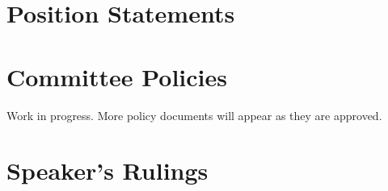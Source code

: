 \documentclass[12pt,letterpaper,oneside]{book}
\renewcommand{\thefootnote}{\fnsymbol{footnote}}%
\begin{document}
\chapter{Position Statements}


\chapter{Committee Policies}
Work in progress. More policy documents will appear as they are approved.

















\renewcommand{\thefootnote}{\arabic{footnote}}%
\setcounter{footnote}{0}%

\chapter{Speaker's Rulings}






\newpage
 
%
\printindex
\end{document}
